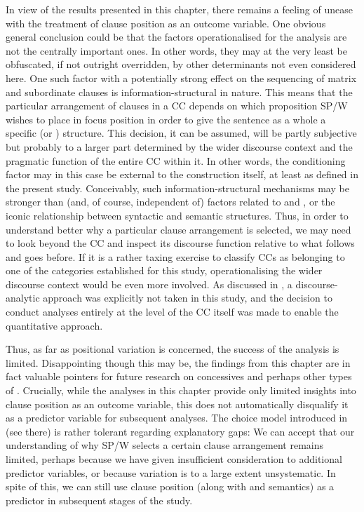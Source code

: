 In view of the results presented in this chapter, there remains a feeling of unease with the treatment of clause position as an outcome variable. One obvious general conclusion could be that the factors operationalised for the analysis are not the centrally important ones. In other words, they may at the very least be obfuscated, if not outright overridden, by other determinants not even considered here. One such factor with a potentially strong effect on the sequencing of matrix and subordinate clauses is information-structural in nature. This means that the particular arrangement of clauses in a CC depends on which proposition SP/W wishes to place in focus position in order to give the sentence as a whole a specific  (or ) structure. This decision, it can be assumed, will be partly subjective but probably to a larger part determined by the wider discourse context and the pragmatic function of the entire CC within it. In other words, the conditioning factor may in this case be external to the construction itself, at least as defined in the present study. Conceivably, such information-structural mechanisms may be stronger than (and, of course, independent of) factors related to  and , or the iconic relationship between syntactic and semantic structures. Thus, in order to understand better why a particular clause arrangement is selected, we may need to look beyond the CC and inspect its discourse function relative to what follows and goes before. If it is a rather taxing exercise to classify CCs as belonging to one of the categories established for this study, operationalising the wider discourse context would be even more involved. As discussed in , a discourse-analytic approach was explicitly not taken in this study, and the decision to conduct analyses entirely at the level of the CC itself was made to enable the quantitative approach.

Thus, as far as positional variation is concerned, the success of the analysis is limited. Disappointing though this may be, the findings from this chapter are in fact valuable pointers for future research on concessives and perhaps other types of . Crucially, while the analyses in this chapter provide only limited insights into clause position as an outcome variable, this does not automatically disqualify it as a predictor variable for subsequent analyses. The choice model introduced in  (see  there) is rather tolerant regarding explanatory gaps: We can accept that our understanding of why SP/W selects a certain clause arrangement remains limited, perhaps because we have given insufficient consideration to additional predictor variables, or because variation is to a large extent unsystematic. In spite of this, we can still use clause position (along with  and semantics) as a predictor in subsequent stages of the study.
